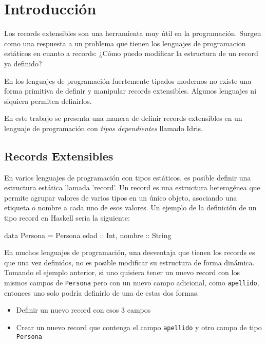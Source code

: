 
\chapter{Introducción}
\label{ch:1}

Los records extensibles son una herramienta muy útil en la programación. Surgen como una respuesta a un problema que tienen los lenguajes de programacion estáticos en cuanto a records: ¿Cómo puedo modificar la estructura de un record ya definido?

En los lenguajes de programación fuertemente tipados modernos no existe una forma primitiva de definir y manipular records extensibles. Algunos lenguajes ni siquiera permiten definirlos.

En este trabajo se presenta una manera de definir records extensibles en un lenguaje de programación con \textit{tipos dependientes} llamado Idris.

\section{Records Extensibles}

En varios lenguajes de programación con tipos estáticos, es posible definir una estructura estática llamada 'record'. Un record es una estructura heterogénea que permite agrupar valores de varios tipos en un único objeto, asociando una etiqueta o nombre a cada uno de esos valores.
Un ejemplo de la definición de un tipo record en Haskell sería la siguiente:

\begin{code}
data Persona = Persona { edad :: Int, nombre :: String}
\end{code}

En muchos lenguajes de programación, una desventaja que tienen los records es que una vez definidos, no es posible modificar su estructura de forma dinámica. Tomando el ejemplo anterior, si uno quisiera tener un nuevo record con los mismos campos de \texttt{Persona} pero con un nuevo campo adicional, como \texttt{apellido}, entonces uno solo podría definirlo de una de estas dos formas:
\begin{itemize}[noitemsep]
\item Definir un nuevo record con esos 3 campos
\item Crear un nuevo record que contenga el campo \texttt{apellido} y otro campo de tipo \texttt{Persona}
\end{itemize}

